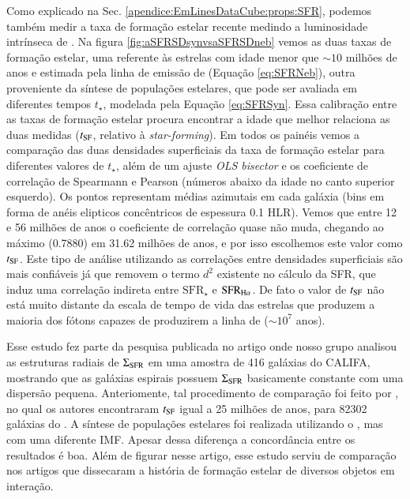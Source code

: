 Como explicado na Sec. \ref{apendice:EmLinesDataCube:props:SFR}, podemos também medir a taxa de formação estelar recente medindo a luminosidade intrínseca de \Ha. Na figura \ref{fig:aSFRSDsynvsaSFRSDneb} vemos as duas taxas de formação estelar, uma referente às estrelas com idade menor que $\sim 10$ milhões de anos e estimada pela linha de emissão de \Ha (Equação \ref{eq:SFRNeb}), outra proveniente da síntese de populações estelares, que pode ser avaliada em diferentes tempos $t_\star$, modelada pela Equação \ref{eq:SFRSyn}. Essa calibração entre as taxas de formação estelar procura encontrar a idade que melhor relaciona as duas medidas ($t_{\rm SF}$, relativo à {\em star-forming}). Em todos os painéis vemos a comparação das duas densidades superficiais da taxa de formação estelar para diferentes valores de $t_\star$, além de um ajuste {\em OLS bisector} e os coeficiente de correlação de Spearmann e Pearson (números abaixo da idade no canto superior esquerdo). Os pontos representam médias azimutais em cada galáxia (bins em forma de anéis elipticos concêntricos de espessura 0.1 HLR). Vemos que entre 12 e 56 milhões de anos o coeficiente de correlação quase não muda, chegando ao máximo (0.7880) em 31.62 milhões de anos, e por isso escolhemos este valor como $t_{\rm SF}$. Este tipo de análise utilizando as correlações entre densidades superficiais são mais confiáveis já que removem o termo $d^2$ existente no cálculo da SFR, que induz uma correlação indireta entre $\mathrm{SFR}_\star$ e $\mathrm{SFR}_{\Ha}$. De fato o valor de $t_{\rm SF}$ não está muito distante da escala de tempo de vida das estrelas que produzem a maioria dos fótons capazes de produzirem a linha de \Ha ($\sim10^7$ anos).

Esse estudo fez parte da pesquisa publicada no artigo \citep{GonzalezDelgado.etal.2016a} onde nosso grupo analisou as estruturas radiais de $\Sigma_{\rm SFR}$ em uma amostra de 416 galáxias do CALIFA, mostrando que as galáxias espirais possuem $\Sigma_{\rm SFR}$ basicamente constante com uma dispersão pequena. Anteriomente, tal procedimento de comparação foi feito por \citet{Asari.etal.2007a}, no qual os autores encontraram $t_{\rm SF}$ igual a 25 milhões de anos, para 82302 galáxias do \SDSS. A síntese de populações estelares foi realizada utilizando o \starlight, mas com uma diferente IMF. Apesar dessa diferença a concordância entre os resultados é boa. Além de figurar nesse artigo, esse estudo serviu de comparação nos artigos \citet{CortijoFerrero.etal.2017a, CortijoFerrero.etal.2017b, CortijoFerrero.etal.2017c} que dissecaram a história de formação estelar de diversos objetos em interação.

